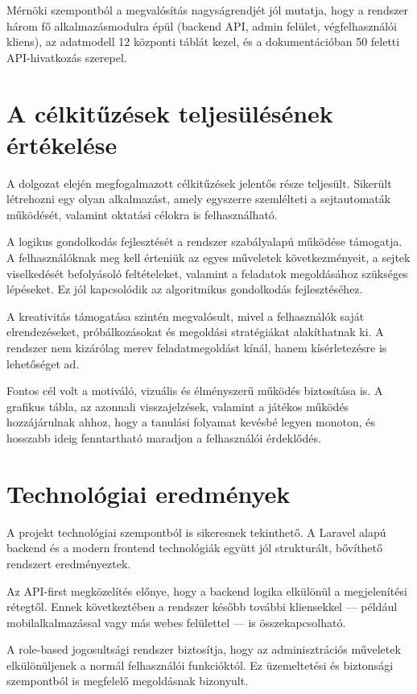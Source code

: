 \documentclass{thesis-ekf}
\begin{document}
Mérnöki szempontból a megvalósítás nagyságrendjét jól mutatja, hogy a rendszer három fő alkalmazásmodulra épül (backend API, admin felület, végfelhasználói kliens), az adatmodell 12 központi táblát kezel, és a dokumentációban 50 feletti API-hivatkozás szerepel.

\section{A célkitűzések teljesülésének értékelése}
A dolgozat elején megfogalmazott célkitűzések jelentős része teljesült. Sikerült létrehozni egy olyan alkalmazást, amely egyszerre szemlélteti a sejtautomaták működését, valamint oktatási célokra is felhasználható.

A logikus gondolkodás fejlesztését a rendszer szabályalapú működése támogatja. A felhasználóknak meg kell érteniük az egyes műveletek következményeit, a sejtek viselkedését befolyásoló feltételeket, valamint a feladatok megoldásához szükséges lépéseket. Ez jól kapcsolódik az algoritmikus gondolkodás fejlesztéséhez.

A kreativitás támogatása szintén megvalósult, mivel a felhasználók saját elrendezéseket, próbálkozásokat és megoldási stratégiákat alakíthatnak ki. A rendszer nem kizárólag merev feladatmegoldást kínál, hanem kísérletezésre is lehetőséget ad.

Fontos cél volt a motiváló, vizuális és élményszerű működés biztosítása is. A grafikus tábla, az azonnali visszajelzések, valamint a játékos működés hozzájárulnak ahhoz, hogy a tanulási folyamat kevésbé legyen monoton, és hosszabb ideig fenntartható maradjon a felhasználói érdeklődés.

\section{Technológiai eredmények}
A projekt technológiai szempontból is sikeresnek tekinthető. A Laravel alapú backend és a modern frontend technológiák együtt jól strukturált, bővíthető rendszert eredményeztek.

Az API-first megközelítés előnye, hogy a backend logika elkülönül a megjelenítési rétegtől. Ennek következtében a rendszer később további kliensekkel --- például mobilalkalmazással vagy más webes felülettel --- is összekapcsolható.

A role-based jogosultsági rendszer biztosítja, hogy az adminisztrációs műveletek elkülönüljenek a normál felhasználói funkcióktól. Ez üzemeltetési és biztonsági szempontból is megfelelő megoldásnak bizonyult.
\end{document}
